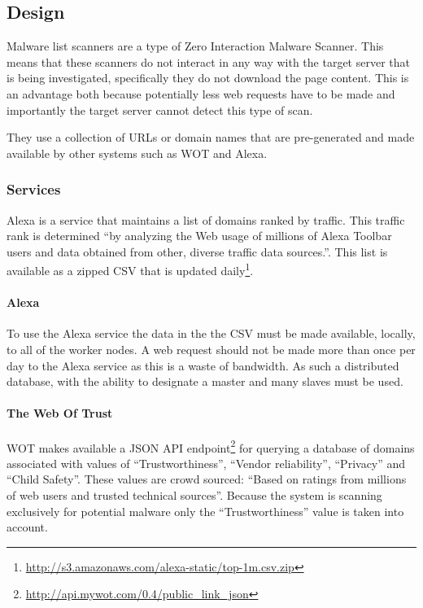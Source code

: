 \subsection{Design}
Malware list scanners are a type of Zero Interaction Malware Scanner. This means that these scanners do not interact in any way with the target server that is being investigated, specifically they do not download the page content. This is an advantage both because potentially less web requests have to be made and importantly the target server cannot detect this type of scan.

They use a collection of URLs or domain names that are pre-generated and made available by other systems such as WOT and Alexa.
\subsubsection{Services}

Alexa is a service that maintains a list of domains ranked by traffic. This traffic rank is determined ``by analyzing the Web usage of millions of Alexa Toolbar users and data obtained from other, diverse traffic data sources.''\cite{alexa-about}. This list is available as a zipped CSV that is updated daily\footnote{\url{http://s3.amazonaws.com/alexa-static/top-1m.csv.zip}}.

\paragraph{Alexa}
To use the Alexa service the data in the the CSV must be made available, locally, to all of the worker nodes. A web request should not be made more than once per day to the Alexa service as this is a waste of bandwidth. As such a distributed database, with the ability to designate a master and many slaves must be used.

\paragraph{The Web Of Trust}
WOT makes available a JSON API endpoint\footnote{\url{http://api.mywot.com/0.4/public_link_json}} for querying a database of domains associated with values of ``Trustworthiness'', ``Vendor reliability'', ``Privacy'' and ``Child Safety''. These values are crowd sourced: ``Based on ratings from millions of web users and trusted technical sources''\cite{wot-about}. Because the system is scanning exclusively for potential malware only the ``Trustworthiness'' value is taken into account.

